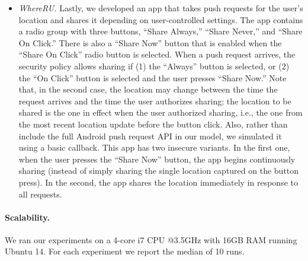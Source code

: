 \begin{itemize}
\item \textit{WhereRU.} Lastly, we developed an app
  that takes push requests for the user's location and shares it depending
  on user-controlled settings.
  The app contains a radio group with three buttons, ``Share Always,'' ``Share
  Never,'' and ``Share On Click.'' There is also a ``Share Now'' button that
  is enabled when the ``Share On Click'' radio button is selected.  When a
  push request arrives, the security policy allows sharing if (1) the ``Always''
  button is selected, or (2) the ``On Click'' button is selected and the user
  presses ``Share Now.'' Note that, in the second case, the location may
  change between the time the request arrives and the time the user authorizes
  sharing; the location to be shared is the one in effect when the user
  authorized sharing, i.e., the one from the most recent location update
  before the button click. Also, rather than include the full
  Android push request API in our model, we simulated it using a basic callback.
  This app has two insecure variants. In the first one, when the user
  presses the ``Share Now'' button, the app begins continuously
  sharing (instead of simply sharing the single location captured on
  the button press).  In the second, the app
  shares the location immediately in response to all requests.

\end{itemize}

\paragraph*{Scalability.}
We ran our experiments on a 4-core i7 CPU @3.5GHz with 16GB
RAM running Ubuntu 14. For each experiment we report the median of 10
runs.

